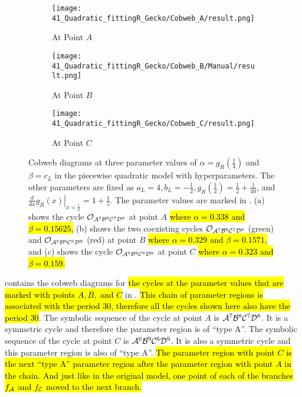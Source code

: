 \begin{figure}
	\centering
	\begin{subfigure}{0.3\textwidth}
		\centering
		\texttt{[image: 41\_Quadratic\_fittingR\_Gecko/Cobweb\_A/result.png]}
		\caption{At Point $A$}
		\label{fig:setup.quad.hyper.2.cobweb.A}
	\end{subfigure}
	\begin{subfigure}{0.3\textwidth}
		\centering
		\texttt{[image: 41\_Quadratic\_fittingR\_Gecko/Cobweb\_B/Manual/result.png]}
		\caption{At Point $B$}
		\label{fig:setup.quad.hyper.2.cobweb.B}
	\end{subfigure}
	\begin{subfigure}{0.3\textwidth}
		\centering
		\texttt{[image: 41\_Quadratic\_fittingR\_Gecko/Cobweb\_C/result.png]}
		\caption{At Point $C$}
		\label{fig:setup.quad.hyper.2.cobweb.C}
	\end{subfigure}
	\caption[Cobwebs of the piecewise quadratic model with hyperparameters for different values of the fixed parameters]{
	Cobweb diagrams at three parameter values of $\alpha = g_R\left(\frac{1}{4}\right)$ and $\beta = c_L$ in the piecewise quadratic model with hyperparameters.
	The other parameters are fixed as $a_L = 4, b_L = -\frac{1}{2}, g_R\left(\frac{1}{2}\right) = \frac{1}{2} + \frac{1}{40}$, and $\left. \frac{d}{dx} g_R(x) \right|_{x = \frac{1}{2}} = 1 + \frac{1}{5}$.
	The parameter values are marked in .
	(a) shows the cycle $\mathcal{O}_{\mathcal{A}^7\mathcal{B}^8\mathcal{C}^7\mathcal{D}^8}$ at point $A$ \hl{where $\alpha = 0.338$ and $\beta = 0.15625$,}
	(b) shows the two coexisting cycles $\mathcal{O}_{\mathcal{A}^7\mathcal{B}^8\mathcal{C}^7\mathcal{D}^8}$ (green) and $\mathcal{O}_{\mathcal{A}^6\mathcal{B}^9\mathcal{C}^6\mathcal{D}^9}$ (red) at point $B$ \hl{where $\alpha = 0.329$ and $\beta = 0.1571$,}
	and (c) shows the cycle $\mathcal{O}_{\mathcal{A}^6\mathcal{B}^9\mathcal{C}^6\mathcal{D}^9}$ at point $C$ \hl{where $\alpha = 0.323$ and $\beta = 0.159$.}
	}
	\label{fig:setup.quad.hyper.2.cobwebs}
\end{figure}

 contains the cobweb diagrams for \hl{the cycles at the parameter values that are marked with points $A, B,$ and $C$} in .
\hl{This chain of parameter regions is associated with the period $30$, therefore all the cycles shown here also have the period $30$}.
The symbolic sequence of the cycle at point $A$ is $\mathcal{A}^7\mathcal{B}^8\mathcal{C}^7\mathcal{D}^8$.
It is a symmetric cycle and therefore the parameter region is of ``type A''.
The symbolic sequence of the cycle at point $C$ is $\mathcal{A}^6\mathcal{B}^9\mathcal{C}^6\mathcal{D}^9$.
It is also a symmetric cycle and this parameter region is also of ``type A''.
\hl{
	The parameter region with point $C$ is the next ``type A'' parameter region after the parameter region with point $A$ in the chain.
	And just like in the original model, one point of each of the branches $f_{\mathcal{A}}$ and $f_{\mathcal{C}}$ moved to the next branch.
}

